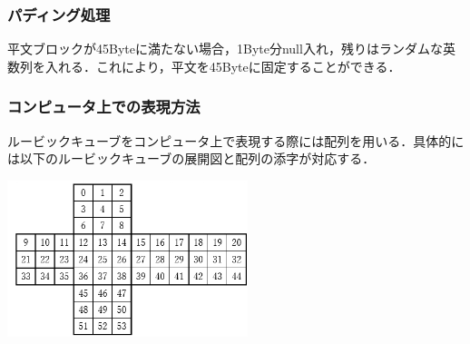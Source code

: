 \documentclass{jsarticle}
\begin{document}
\subsubsection{パディング処理}
平文ブロックが45Byteに満たない場合，1Byte分null入れ，残りはランダムな英数列を入れる．これにより，平文を45Byteに固定することができる．

\subsubsection{コンピュータ上での表現方法}
ルービックキューブをコンピュータ上で表現する際には配列を用いる．具体的には以下のルービックキューブの展開図と配列の添字が対応する．\\

\begin{center}
  \includegraphics[width=7cm]{./tex_pic/seq.jpg}\\
\end{center}
    
\end{document}
